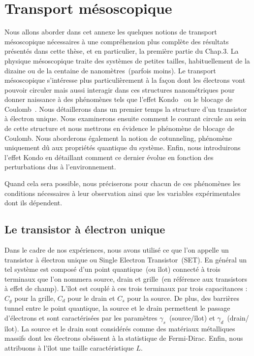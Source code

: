 \chapter{Transport mésoscopique}
\renewcommand{\thefigure}{\thechapter.\arabic{figure}}

Nous allons aborder dans cet annexe les quelques notions de transport mésoscopique nécessaires à une compréhension plus complète des résultats présentés dans cette thèse, et en particulier, la première partie du Chap.3. La physique mésoscopique traite des systèmes de petites tailles, habituellement de la dizaine ou de la centaine de nanomètres~(parfois moins). Le transport mésoscopique s'intéresse plus particulièrement à la façon dont les électrons vont pouvoir circuler mais aussi interagir dans ces structures nanométriques pour donner naissance à des phénomènes tels que l'effet Kondo~\cite{Kondo1964} ou le blocage de Coulomb~\cite{Beenakker1991}. Nous détaillerons dans un premier temps la structure d'un transistor à électron unique. Nous examinerons ensuite comment le courant circule au sein de cette structure et nous mettrons en évidence le phénomène de blocage de Coulomb. Nous aborderons également la notion de cotunneling, phénomène uniquement dû aux propriétés quantique du système. Enfin, nous introduirons l'effet Kondo en détaillant comment ce dernier évolue en fonction des perturbations dus à l'environnement.

Quand cela sera possible, nous préciserons pour chacun de ces phénomènes les conditions nécessaires à leur observation ainsi que les variables expérimentales dont ils dépendent.


\section{Le transistor à électron unique}
Dans le cadre de nos expériences, nous avons utilisé ce que l'on appelle un transistor à électron unique ou Single Electron Transistor~(SET). En général un tel système est composé d'un point quantique~(ou îlot) connecté à trois terminaux que l'on nommera source, drain et grille~(en référence aux transistors à effet de champ). L'\^ilot est couplé à ces trois terminaux par trois capacitances : $C_g$ pour la grille, $C_d$ pour le drain et $C_s$ pour la source. De plus, des barrières tunnel entre le point quantique, la source et le drain permettent le passage d'électrons et sont caractérisées par les paramètres $\gamma_s$~(source/\^ilot) et $\gamma_d$~(drain/\^ilot). La source et le drain sont considérés comme des matériaux métalliques massifs dont les électrons obéissent à la statistique de Fermi-Dirac. Enfin, nous attribuons à l'\^ilot une taille caractéristique $L$. 

